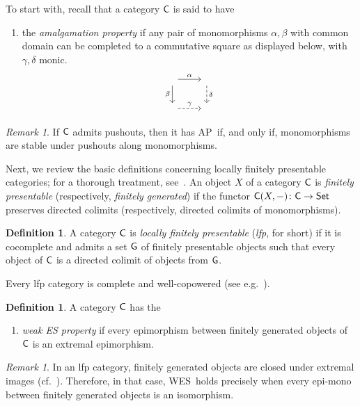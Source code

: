 \documentclass[a4paper,10pt,reqno]{amsart}
\theoremstyle{definition}
\newtheorem{definition}[theorem]{Definition}
\theoremstyle{remark}
\newtheorem{remark}[theorem]{Remark}
\newcommand{\cat}{{\sf C}}								%
\newcommand{\Set}{{\sf Set}}							%
\newcommand{\WES}{\textnormal{WES}}
\newcommand{\AP}{\textnormal{AP}}
\begin{document}
To start with, recall that a category $\cat$ is said to have
\begin{enumerate}
\item[(AP)]\label{AP} the \emph{amalgamation property} if any pair of monomorphisms $\alpha,\beta$ with common domain can be completed to a commutative square as displayed below, with $\gamma, \delta$ monic.
\[\begin{tikzcd}
\phantom{\cdot} \arrow{r}{\alpha} \arrow{d}[swap]{\beta} & \phantom{\cdot} \arrow[dashed]{d}{\delta} \\
\phantom{\cdot} \arrow[dashed]{r}{\gamma} & \phantom{\cdot}
\end{tikzcd}\]
\end{enumerate}


\begin{remark}
If $\cat$ admits pushouts, then it has \AP~if, and only if, monomorphisms are stable under pushouts along monomorphisms. 
\end{remark}

Next, we review the basic definitions concerning locally finitely presentable categories; for a thorough treatment, see~\cite{ar94book}. An object $X$ of a category $\cat$ is \emph{finitely presentable} (respectively, \emph{finitely generated}) if the functor $\cat(X,-)\colon \cat\to\Set$ preserves directed colimits (respectively, directed colimits of monomorphisms).
%
\begin{definition}
A category $\cat$ is \emph{locally finitely presentable} (\emph{lfp}, for short) if it is cocomplete and admits a set $\sf G$ of finitely presentable objects such that every object of $\cat$ is a directed colimit of objects from $\sf G$.
\end{definition}

Every lfp category is complete and well-copowered (see e.g.\ \cite[Corollary~1.28 and Theorem~1.58]{ar94book}).

%
\begin{definition}\label{d:WES}
A category $\cat$ has the
\begin{enumerate}
\item[(\WES)]\label{WES} \emph{weak ES property} if every epimorphism between finitely generated objects of $\cat$ is an extremal epimorphism.
\end{enumerate}
\end{definition}

\begin{remark}\label{rm:WES-in-lfp}
In an lfp category, finitely generated objects are closed under extremal images (cf.\ \cite[Proposition~1.69]{ar94book}). Therefore, in that case, \WES~holds precisely when every epi-mono between finitely generated objects is an isomorphism.
\end{remark}
\end{document}
